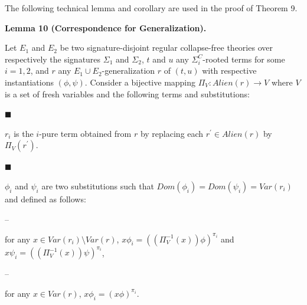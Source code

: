 \documentclass[10pt,a4paper]{amsart}
\begin{document}
 
 
The following technical lemma and corollary are used in the proof of Theorem 9.\par
 
 
 
\par\medskip\noindent\textbf{Lemma 10 (Correspondence for Generalization).}\par
 
 
Let $E_{1}$ and $E_{2}$ be two signature-disjoint regular collapse-free theories over respectively the signatures $\Sigma_{1}$ and $\Sigma_{2}$, $t$ and $u$ any ${\Sigma}^{C}_{i}$-rooted terms for some $i=1,2$, and $r$ any $E_{1}\cup E_{2}$-generalization $r$ of $(t,u)$ with respective instantiations $(\phi,\psi)$. Consider a bijective mapping $\Pi_{V}:Alien(r)\rightarrow V$ where $V$ is a set of fresh variables and the following terms and substitutions:\par
  
\par\noindent  $\blacksquare$ 
 
$r_{i}$ is the $i$-pure term obtained from $r$ by replacing each $r^{\prime}\in Alien(r)$ by $\Pi_{V}(r^{\prime})$.\par
 
 
 
\par\noindent  $\blacksquare$ 
 
$\phi_{i}$ and $\psi_{i}$ are two substitutions such that $\mathit{Dom}(\phi_{i})=\mathit{Dom}(\psi_{i})=\mathit{Var}(r_{i})$ and defined as follows:\par
  
\par\noindent  – 
 
for any $x\in\mathit{Var}(r_{i})\setminus\mathit{Var}(r)$, $x\phi_{i}=((\Pi_{V}^{-1}(x))\phi)^{\pi_{i}}$ and $x\psi_{i}=((\Pi_{V}^{-1}(x))\psi)^{\pi_{i}}$,\par
 
 
 
\par\noindent  – 
 
for any $x\in\mathit{Var}(r)$, $x\phi_{i}=(x\phi)^{\pi_{i}}$.\par
 
\end{document}
